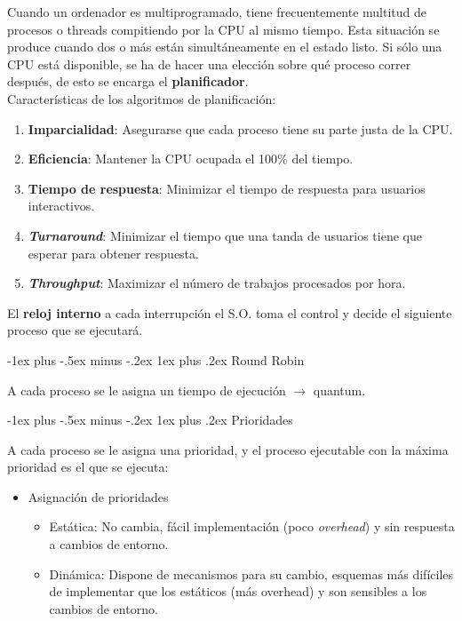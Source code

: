 \documentclass[10pt,portrait, twocolumn]{article}
\makeatletter
\renewcommand{\subsubsection}{\@startsection{subsubsection}{3}{0mm}%
                                {-1ex plus -.5ex minus -.2ex}%
                                {1ex plus .2ex}%
                                {\normalfont\small\bfseries}}
\makeatother
\begin{document}
Cuando un ordenador es multiprogramado, tiene frecuentemente multitud de procesos o threads compitiendo por la CPU al mismo tiempo. Esta situación se produce cuando dos o más están simultáneamente en el estado listo. Si sólo una CPU está disponible, se ha de hacer una elección sobre qué proceso correr después, de esto se encarga el \textbf{planificador}.\\

Características de los algoritmos de planificación:
 
 	\begin{enumerate}
		\item \textbf{Imparcialidad}: Asegurarse que cada proceso tiene su parte justa de la CPU.
		\item \textbf{Eficiencia}: Mantener la CPU ocupada el 100\% del tiempo.
		\item \textbf{Tiempo de respuesta}: Minimizar el tiempo de respuesta para usuarios interactivos.
		\item \textbf{\textit{Turnaround}}: Minimizar el tiempo que una tanda de usuarios tiene que esperar para obtener respuesta.
		\item \textbf{\textit{Throughput}}: Maximizar el número de trabajos procesados por hora.
	\end{enumerate}
	
El \textbf{reloj interno} a cada interrupción el S.O. toma el control y decide el siguiente proceso que se ejecutará.

\subsubsection{Round Robin}

A cada proceso se le asigna un tiempo de ejecución $\rightarrow$ quantum. 
	
\subsubsection{Prioridades}

A cada proceso se le asigna una prioridad, y el proceso ejecutable con la máxima prioridad es el que se ejecuta:

	\begin{itemize}
	\item Asignación de prioridades
		\begin{itemize}
		\item Estática: No cambia, fácil implementación (poco \textit{overhead}) y sin respuesta a cambios de entorno.
		\item Dinámica: Dispone de mecanismos para su cambio, esquemas más difíciles de implementar que los estáticos (más overhead) y son sensibles a los cambios de entorno.
		\end{itemize}
	\end{itemize}
\end{document}
